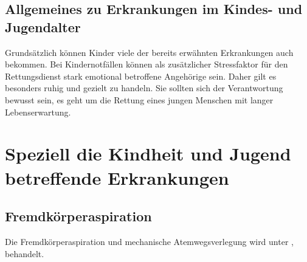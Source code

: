 \subsection{Allgemeines zu Erkrankungen im Kindes- und
Jugendalter}

Grundsätzlich können Kinder viele der bereits erwähnten
Erkrankungen auch bekommen. Bei Kindernotfällen können als
zusätzlicher Stressfaktor für den Rettungsdienst stark
emotional betroffene Angehörige sein. Daher gilt es
besonders ruhig und gezielt zu handeln. Sie sollten sich der
Verantwortung bewusst sein, es geht um die Rettung eines
jungen Menschen mit langer Lebenserwartung.


\section{Speziell die Kindheit und Jugend betreffende Erkrankungen}




\subsection{Fremdkörperaspiration}

Die Fremdkörperaspiration und mechanische Atemwegsverlegung wird unter
,
behandelt.


% 
% 
% 
% 

